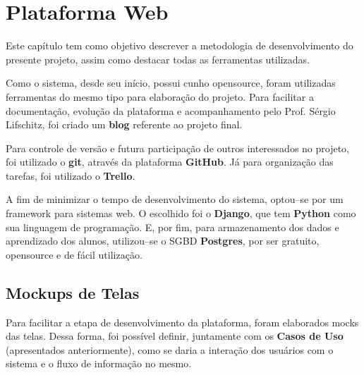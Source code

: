 \documentclass[graduacao,brazil]{ThesisPUC}
\begin{document}

\chapter{Plataforma Web}

Este cap\'{i}tulo tem como objetivo descrever a metodologia de desenvolvimento do presente projeto,
assim como destacar todas as ferramentas utilizadas.

Como o sistema, desde seu in\'{i}cio, possui cunho opensource, foram utilizadas ferramentas do mesmo
tipo para elabora\c{c}\~{a}o do projeto. Para facilitar a documenta\c{c}\~{a}o, evolu\c{c}\~{a}o da plataforma e
acompanhamento pelo Prof. S\'{e}rgio Lifschitz, foi criado um \textbf{blog} \cite{Blog} referente ao projeto final.

Para controle de vers\~{a}o e futura participa\c{c}\~{a}o de outros interessados no projeto, foi utilizado
o \textbf{git}, atrav\'{e}s da plataforma \textbf{GitHub}. J\'{a} para organiza\c{c}\~{a}o das tarefas, foi
utilizado o \textbf{Trello}.

A fim de minimizar o tempo de desenvolvimento do sistema, optou--se por um framework para sistemas web.
O escolhido foi o \textbf{Django}, que tem \textbf{Python} como sua linguagem de programa\c{c}\~{a}o.
E, por fim, para armazenamento dos dados e aprendizado dos alunos, utilizou--se o SGBD \textbf{Postgres},
por ser gratuito, opensource e de f\'{a}cil utiliza\c{c}\~{a}o.


\section{Mockups de Telas}

Para facilitar a etapa de desenvolvimento da plataforma, foram elaborados mocks das telas.
Dessa forma, foi poss\'{i}vel definir, juntamente com os \textbf{Casos de Uso} (apresentados anteriormente), como
se daria a intera\c{c}\~{a}o dos usu\'{a}rios com o sistema e o fluxo de informa\c{c}\~{a}o no
mesmo.
\end{document}
